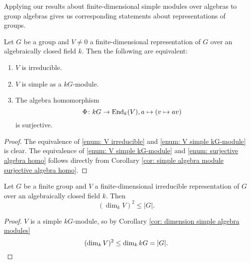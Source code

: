 Applying our results about finite-dimensional simple modules over algebras to group algebras gives us corresponding statements about representations of groups.


\begin{lem}\label{lem: equivalence to irreducible}
  Let $G$ be a group and $V \neq 0$ a finite-dimensional representation of $G$ over an algebraically closed field $k$. Then the following are equivalent:
  \begin{enumerate}[label=\emph{\roman*)},leftmargin=*]
    \item \label{enum: V irreducible}
      $V$ is irreducible.
    \item \label{enum: V simple kG-module}
      $V$ is simple as a $kG$-module.
    \item \label{enum: surjective algebra homo}
      The algebra homomorphism
      \[
        \Phi \colon kG \to \operatorname{End}_k(V), a \mapsto (v \mapsto av)
      \]
      is surjective.
  \end{enumerate}
\end{lem}
\begin{proof}
  The equivalence of \ref{enum: V irreducible} and \ref{enum: V simple kG-module} is clear. The equivalence of \ref{enum: V simple kG-module} and \ref{enum: surjective algebra homo} follows directly from Corollary \ref{cor: simple algebra module surjective algebra homo}.
\end{proof}


\begin{cor}
  Let $G$ be a finite group and $V$ a finite-dimensional irreducible representation of $G$ over an algebraically closed field $k$. Then
  \[
    \left( \dim_k V \right)^2 \leq |G|.
  \]
\end{cor}
\begin{proof}
  $V$ is a simple $kG$-module, so by Corollary \ref{cor: dimension simple algebra modules}
  \[
    (\dim_k V)^2 \leq \dim_k kG = |G|.
    \qedhere
  \]
\end{proof}


